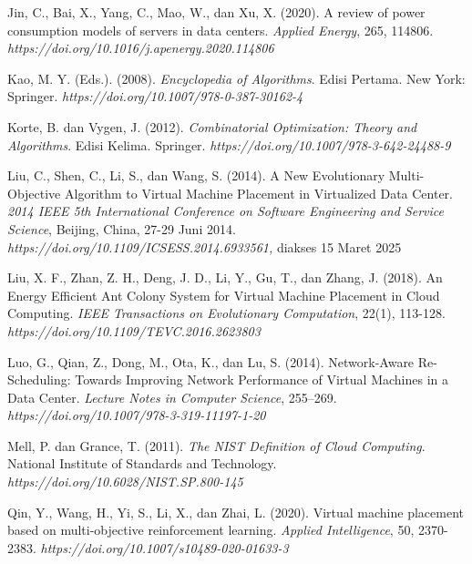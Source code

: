 \begin{thebibliography}{99}
	

	Jin, C., Bai, X., Yang, C., Mao, W., dan Xu, X. (2020). A review of power consumption models of servers in data centers. \textit{Applied Energy}, 265, 114806. \textit{https://doi.org/10.1016/j.apenergy.2020.114806}
	
	

	Kao, M. Y. (Eds.). (2008). \textit{Encyclopedia of Algorithms}. Edisi Pertama. New York: Springer. \textit{https://doi.org/10.1007/978-0-387-30162-4}
	
	

	Korte, B. dan Vygen, J. (2012). \textit{Combinatorial Optimization: Theory and Algorithms}. Edisi Kelima. Springer. \textit{https://doi.org/10.1007/978-3-642-24488-9}
	
	

	Liu, C., Shen, C., Li, S., dan Wang, S. (2014). A New Evolutionary Multi-Objective Algorithm to Virtual Machine Placement in Virtualized Data Center. \textit{2014 IEEE 5th International Conference on Software Engineering and Service Science}, Beijing, China, 27-29 Juni 2014. \textit{https://doi.org/10.1109/ICSESS.2014.6933561,} diakses 15 Maret 2025 
	
	

	Liu, X. F., Zhan, Z. H., Deng, J. D., Li, Y., Gu, T., dan Zhang, J. (2018). An Energy Efficient Ant Colony System for Virtual Machine Placement in Cloud Computing. \textit{IEEE Transactions on Evolutionary Computation}, 22(1), 113-128. \textit{https://doi.org/10.1109/TEVC.2016.2623803}
	
	

	Luo, G., Qian, Z., Dong, M., Ota, K., dan Lu, S. (2014). Network-Aware Re-Scheduling: Towards Improving Network Performance of Virtual Machines in a Data Center. \textit{Lecture Notes in Computer Science}, 255–269. \textit{https://doi.org/10.1007/978-3-319-11197-1-20}
	
	

	Mell, P. dan Grance, T. (2011). \textit{The NIST Definition of Cloud Computing}. National Institute of Standards and Technology. \textit{https://doi.org/10.6028/NIST.SP.800-145} 
	
	

	Qin, Y., Wang, H., Yi, S., Li, X., dan Zhai, L. (2020). Virtual machine placement based on multi-objective reinforcement learning. \textit{Applied Intelligence}, 50, 2370-2383. \textit{https://doi.org/10.1007/s10489-020-01633-3} 
	

\end{thebibliography}
